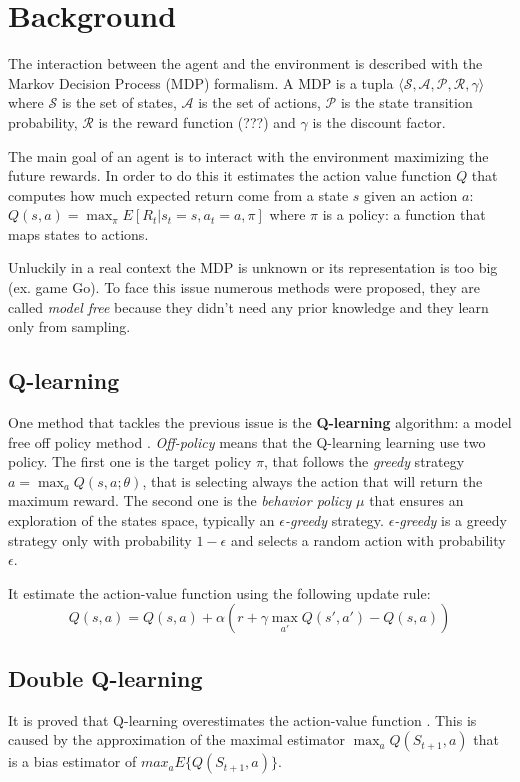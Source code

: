 \section{Background}


The interaction between the agent and the environment is described  with the
Markov Decision Process (MDP) formalism. A MDP is a tupla $\langle \mathcal{S}, 
\mathcal{A}, \mathcal{P}, \mathcal{R}, \gamma \rangle$ where $\mathcal{S}$ is
the set of states, $\mathcal{A}$ is the set of actions, $\mathcal{P}$ is the 
state transition probability, $\mathcal{R}$ is the reward function (???) and 
$\gamma$ is the discount factor.

The main goal of an agent is to interact with the environment maximizing the future rewards. In order to do this it estimates the action value function $Q$ that computes how much expected return come from a state $s$ given an action $a$: $Q(s, a) = \max_\pi E[R_t | s_t = s, a_t = a, \pi]$ where $\pi$ is a policy: a function that maps states to actions.


Unluckily in a real context the MDP is unknown or its representation is too big
(ex. game Go). To face this issue numerous methods were proposed, they are 
called \textit{model free} because they didn't need any prior knowledge and they learn only from sampling.


\subsection{Q-learning}

One method that tackles the previous issue is the \textbf{Q-learning} algorithm: a model free off policy method \cite{Watkins1992}. 
\textit{Off-policy} means that the Q-learning learning use two policy. The first one is the target policy $\pi$, that follows the \textit{greedy} strategy $a = \max_a Q(s, a; \theta)$, that is selecting always the action that will return the maximum reward.
The second one is the \textit{behavior policy} $\mu$ that ensures an exploration of the states space, typically an \textit{$\epsilon$-greedy} strategy. \textit{$\epsilon$-greedy} is a greedy strategy only with probability $1 - \epsilon$ and selects a random action with probability $\epsilon$.

It estimate the action-value function using the following update rule:
\begin{equation}
	Q(s,a) = Q(s, a) + \alpha (r + \gamma \max_{a'} Q(s', a') - Q(s, a))
\end{equation}


\subsection{Double Q-learning}

It is proved that Q-learning overestimates the action-value function 
\cite{NIPS2010_3964}. This is caused by the approximation of the maximal estimator $\max_a Q(S_{t+1}, a)$ that is a bias estimator of $max_a E \{ Q(S_{t+1}, a) \}$. 

